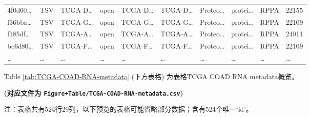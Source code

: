 \documentclass[
]{article}
\begin{document}
\begin{longtable}[]{@{}llllllllll@{}}
4f0d60\ldots{} & TSV & TCGA-D\ldots{} & open & TCGA-D\ldots{} & TCGA-D\ldots{} & Proteo\ldots{} & protei\ldots{} & RPPA & 22155\tabularnewline
f36bba\ldots{} & TSV & TCGA-G\ldots{} & open & TCGA-G\ldots{} & TCGA-G\ldots{} & Proteo\ldots{} & protei\ldots{} & RPPA & 22109\tabularnewline
f185df\ldots{} & TSV & TCGA-A\ldots{} & open & TCGA-A\ldots{} & TCGA-A\ldots{} & Proteo\ldots{} & protei\ldots{} & RPPA & 24011\tabularnewline
be6d80\ldots{} & TSV & TCGA-F\ldots{} & open & TCGA-F\ldots{} & TCGA-F\ldots{} & Proteo\ldots{} & protei\ldots{} & RPPA & 22109\tabularnewline
\ldots{} & \ldots{} & \ldots{} & \ldots{} & \ldots{} & \ldots{} & \ldots{} & \ldots{} & \ldots{} & \ldots{}\tabularnewline
\bottomrule
\end{longtable}

Table \ref{tab:TCGA-COAD-RNA-metadata} (下方表格) 为表格TCGA COAD RNA metadata概览。

\textbf{(对应文件为 \texttt{Figure+Table/TCGA-COAD-RNA-metadata.csv})}

\begin{center}\begin{tcolorbox}[colback=gray!10, colframe=gray!50, width=0.9\linewidth, arc=1mm, boxrule=0.5pt]注：表格共有524行29列，以下预览的表格可能省略部分数据；含有524个唯一`id'。
\end{tcolorbox}
\end{center}
\end{document}

